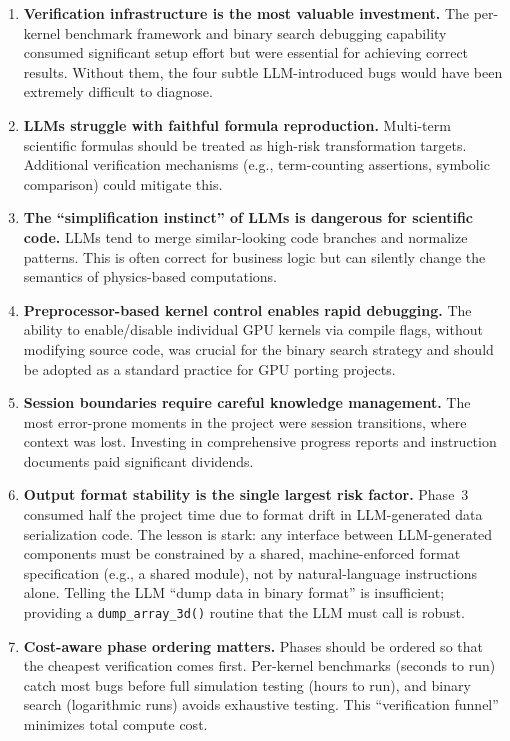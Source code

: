 \documentclass[conference]{IEEEtran}
\begin{document}
\begin{enumerate}
\item \textbf{Verification infrastructure is the most valuable investment.}
  The per-kernel benchmark framework and binary search debugging capability
  consumed significant setup effort but were essential for achieving correct
  results. Without them, the four subtle LLM-introduced bugs would have been
  extremely difficult to diagnose.

\item \textbf{LLMs struggle with faithful formula reproduction.} Multi-term
  scientific formulas should be treated as high-risk transformation targets.
  Additional verification mechanisms (e.g., term-counting assertions, symbolic
  comparison) could mitigate this.

\item \textbf{The ``simplification instinct'' of LLMs is dangerous for
  scientific code.} LLMs tend to merge similar-looking code branches and
  normalize patterns. This is often correct for business logic but can
  silently change the semantics of physics-based computations.

\item \textbf{Preprocessor-based kernel control enables rapid debugging.}
  The ability to enable/disable individual GPU kernels via compile flags,
  without modifying source code, was crucial for the binary search strategy
  and should be adopted as a standard practice for GPU porting projects.

\item \textbf{Session boundaries require careful knowledge management.} The
  most error-prone moments in the project were session transitions, where
  context was lost. Investing in comprehensive progress reports and
  instruction documents paid significant dividends.

\item \textbf{Output format stability is the single largest risk factor.}
  Phase~3 consumed half the project time due to format drift in
  LLM-generated data serialization code. The lesson is stark: any interface
  between LLM-generated components must be constrained by a shared,
  machine-enforced format specification (e.g., a shared module), not by
  natural-language instructions alone. Telling the LLM ``dump data in binary
  format'' is insufficient; providing a \texttt{dump\_array\_3d()} routine
  that the LLM must call is robust.

\item \textbf{Cost-aware phase ordering matters.} Phases should be ordered
  so that the cheapest verification comes first. Per-kernel benchmarks
  (seconds to run) catch most bugs before full simulation testing (hours to
  run), and binary search (logarithmic runs) avoids exhaustive testing.
  This ``verification funnel'' minimizes total compute cost.
\end{enumerate}
\end{document}
